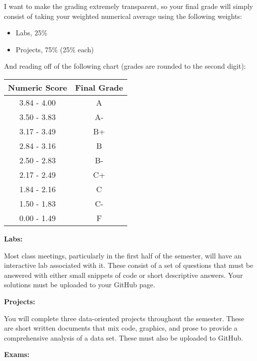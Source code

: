 \documentclass[12pt]{article}
\begin{document}
I want to make the grading extremely transparent, so your final grade will
simply consist of taking your weighted numerical average using the following
weights:

\begin{itemize}\setlength\itemsep{0em}
\item Labs, 25\%
\item Projects, 75\% (25\% each)
\end{itemize}

And reading off of the following chart (grades are rounded to the
second digit):

\begin{center}
\begin{tabular}{c || c}
Numeric Score & Final Grade \\
\hline \hline
3.84 - 4.00 & A  \\
3.50 - 3.83 & A- \\
3.17 - 3.49 & B+ \\
2.84 - 3.16 & B  \\
2.50 - 2.83 & B- \\
2.17 - 2.49 & C+ \\
1.84 - 2.16 & C  \\
1.50 - 1.83 & C- \\
0.00 - 1.49 & F
\end{tabular}
\end{center}

\newpage

\textbf{Labs:} \vspace{6pt}

Most class meetings, particularly in the first half of the semester,
will have an interactive lab associated with it. These consist of a
set of questions that must be answered with either small snippets of
code or short descriptive answers. Your solutions must be uploaded
to your GitHub page.

\vspace{0.4cm}

\textbf{Projects:} \vspace{6pt}

You will complete three data-oriented projects throughout
the semester. These are short written documents that mix code,
graphics, and prose to provide a comprehensive analysis of a
data set.  These must also be uploaded to GitHub.

\vspace{0.4cm}

\textbf{Exams:} \vspace{6pt}
\end{document}
